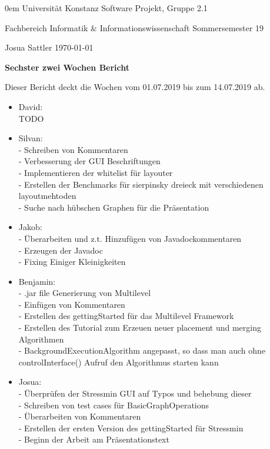 \documentclass[]{article}
\date{}
\begin{document}
	
	{\footnotesize \parindent0em
		{\sc Universität Konstanz} \hfill {\sc Software Projekt, Gruppe 2.1}\par
		{\sc Fachbereich Informatik \& Informationswissenschaft} \hfill Sommersemester 19 \par
		Josua Sattler \hfill \today\par
		\bigskip
		\begin{center}
			{\LARGE\bf Sechster zwei Wochen Bericht}
			\bigskip
		\end{center}
	}
	
	Dieser Bericht deckt die Wochen vom 01.07.2019 bis zum 14.07.2019 ab. \\
	
	\begin{itemize}
				
		\item  David: \\
			TODO	
		\item Silvan: \\
		- Schreiben von Kommentaren \\
		- Verbesserung der GUI Beschriftungen \\
		- Implementieren der whitelist für layouter  \\
		- Erstellen der Benchmarks für sierpinsky dreieck mit verschiedenen layoutmehtoden\\
		- Suche nach hübschen Graphen für die Präsentation
		\item Jakob: \\
		- Überarbeiten und z.t. Hinzufügen von Javadockommentaren\\
        - Erzeugen der Javadoc\\
        - Fixing Einiger Kleinigkeiten
		\item Benjamin: \\
		- .jar file Generierung von Multilevel\\
        - Einfügen von Kommentaren\\
        - Erstellen des gettingStarted für das Multilevel Framework\\ - Erstellen des Tutorial zum Erzeuen neuer placement und merging Algorithmen\\
        - BackgroundExecutionAlgorithm angepasst, so dass man auch ohne controlInterface() Aufruf den Algorithmus starten kann
		\item Josua: \\
		- Überprüfen der Stressmin GUI auf Typos und behebung dieser\\
		- Schreiben von test cases für BasicGraphOperations\\
		- Überarbeiten von Kommentaren\\
		- Erstellen der ersten Version des gettingStarted für Stressmin\\
		- Beginn der Arbeit am Präsentationstext
		
	\end{itemize} 
	
\end{document}
